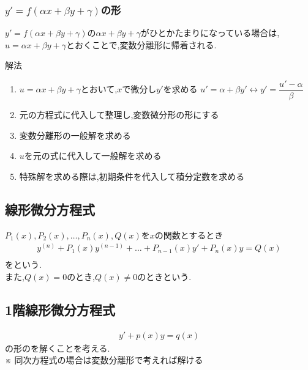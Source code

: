 \documentclass[a4paper]{jsarticle}
\begin{document}
\subsubsection{$y'=f\left(\alpha x+\beta y+\gamma\right)$の形}
$y'=f\left(\alpha x+\beta y+\gamma\right)$の$\alpha x+\beta y+\gamma$がひとかたまりになっている場合は,
$u=\alpha x+\beta y+\gamma$とおくことで,変数分離形に帰着される.
\begin{itembox}[l]{解法}
    \begin{enumerate}[(1)]
        \item $u=\alpha x+\beta y+\gamma$とおいて,$x$で微分し$y'$を求める
              \quad$u'=\alpha+\beta y'\leftrightarrow y'=\dfrac{u'-\alpha}{\beta}$
        \item 元の方程式に代入して整理し,変数微分形の形にする
        \item 変数分離形の一般解を求める
        \item $u$を元の式に代入して一般解を求める
        \item 特殊解を求める際は,初期条件を代入して積分定数を求める
    \end{enumerate}
\end{itembox}
\subsection{線形微分方程式}
$P_1\left(x\right),P_2\left(x\right),\dots,P_n\left(x\right),Q\left(x\right)$を$x$の関数とするとき\\
\begin{eqnarray*}
    y^{\left(n\right)}+P_1\left(x\right)y^{\left(n-1\right)}+\dots+P_{n-1}\left(x\right)y'+P_n\left(x\right)y=Q\left(x\right)\\
\end{eqnarray*}
をという.\\
また,$Q\left(x\right)=0$のとき,$Q\left(x\right)\neq0$のときという.
\subsection{1階線形微分方程式}
\begin{eqnarray*}
    y'+p\left(x\right)y=q\left(x\right)
\end{eqnarray*}
の形のを解くことを考える.\\
※ 同次方程式の場合は変数分離形で考えれば解ける
\end{document}
